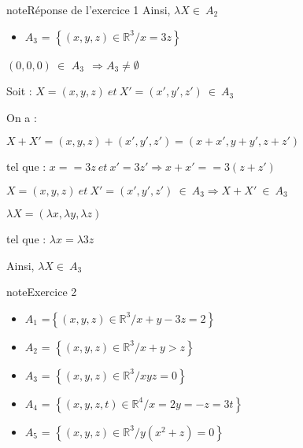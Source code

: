 \documentclass[letterpaper,10pt,french]{jupyterBook}
\begin{document}
\begin{sphinxadmonition}{note}{Réponse de l’exercice 1}
\sphinxAtStartPar
Ainsi, \(\lambda X \in ~A_2\)
\begin{itemize}
\item {} 
\sphinxAtStartPar
\(A_3\) = \( \left\{ (x,y,z) \in \mathbb{R}^3 / x =3z \right\}\)

\end{itemize}

\sphinxAtStartPar
\((0,0,0) ~\in\) \(A_3 ~~ \Rightarrow A_3 \neq  \emptyset\)

\sphinxAtStartPar
Soit :  \(X=(x,y,z) ~ et~ X'= (x',y',z') ~ \in ~A_3\)

\sphinxAtStartPar
On a :

\sphinxAtStartPar
\(X+ X' = (x,y,z) + (x',y',z') = (x+x',y+y',z+z')\)

\sphinxAtStartPar
tel que : \(x= =3z ~et~ x'=3z' \Rightarrow x+x'==3(z+z') \)

\sphinxAtStartPar
\(X=(x,y,z) ~ et~ X'= (x',y',z') ~ \in ~A_3 \Rightarrow X+ X'~ \in ~A_3\)

\sphinxAtStartPar
\(\lambda X = (\lambda x, \lambda y,\lambda z)\)

\sphinxAtStartPar
tel que :
\(\lambda x =\lambda 3z \)

\sphinxAtStartPar
Ainsi, \(\lambda X \in ~A_3\)
\end{sphinxadmonition}

\begin{sphinxadmonition}{note}{Exercice 2}

\sphinxAtStartPar
{}
\begin{itemize}
\item {} 
\sphinxAtStartPar
\(A_1\) =\( \left\{ (x,y,z) \in \mathbb{R}^3 / x+y-3z = 2 \right\}\)

\item {} 
\sphinxAtStartPar
\(A_2\) =  \(\left\{ (x,y,z) \in \mathbb{R}^3 / x+y > z \right\}\)

\item {} 
\sphinxAtStartPar
\(A_3\) = \( \left\{ (x,y,z) \in \mathbb{R}^3 / xyz = 0 \right\}\)

\item {} 
\sphinxAtStartPar
\(A_4\) = \( \left\{ (x,y,z, t) \in \mathbb{R}^4 / x = 2y= -z=3t \right\}\)

\item {} 
\sphinxAtStartPar
\(A_5\) = \( \left\{ (x,y,z) \in \mathbb{R}^3 / y(x^2+z) = 0 \right\}\)

\end{itemize}
\end{sphinxadmonition}
\end{document}
